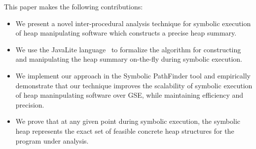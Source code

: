 This paper makes the following contributions:
\begin{itemize}
\item{We present a novel inter-procedural analysis technique for 
symbolic execution of heap manipulating software which constructs 
a precise heap summary.}
\item{We use the JavaLite language~\cite{saints-MS} to formalize 
the algorithm for constructing and manipulating the heap summary
on-the-fly during symbolic execution.}
\item{We implement our approach in the Symbolic PathFinder tool and
empirically demonstrate that our technique improves
the scalability of symbolic execution of heap maninpulating software
over GSE, while maintaining efficiency and precision.}
\item{We prove that at any given point during symbolic execution, the symbolic 
heap represents the exact set of feasible concrete heap structures 
for the program under analysis.}
 \end{itemize}

  



\begin{comment}
\newcommand{\Indstate}[1][1]{\State\hspace{#1\algorithmicindent}}

\begin{figure}
\begin{center}
\begin{algorithmic}[1]
\Procedure{load}{$r,f$}
\If{$r$ is initialized and $f$ is uninitialized}
\If{ $f$ has a reference type}
\State nondeterministically assign to $f$:
\State  \ \ null  %
\State \ \ non-null
\EndIf
\If{$f$ has a primitive type}
\State assign $f$ a new symbol
\EndIf
\EndIf
\If{$r$ is uninitialized}
\State nondeterministically assign to $f$:
\State  \ \ a new symbolic location  %
\State \ \ an existing symbolic location
\EndIf
\State\Return $r.f$
\EndProcedure
\end{algorithmic}
\end{center}
\caption{Lazier\# Initialization}
\end{figure}

Lazy initialization is a symbolic execution technique where memory structures are created on-demand, as they are required.
\end{comment}



